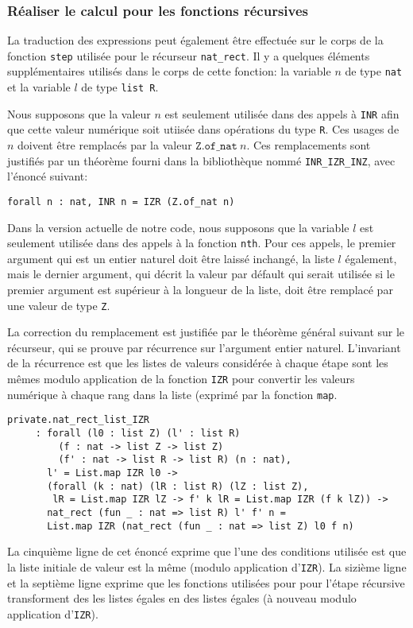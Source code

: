 \documentclass[draft]{jflart}
\begin{document}
\subsubsection{Réaliser le calcul pour les fonctions récursives}
La traduction des expressions peut également être effectuée sur le
corps de la fonction \texttt{step} utilisée pour le récurseur
\texttt{nat\_rect}.  Il y a quelques éléments supplémentaires utilisés
dans le corps de cette fonction: la variable \(n\) de type \texttt{nat}
et la variable \(l\) de type \texttt{list R}.  

Nous supposons que la valeur \(n\) est seulement utilisée dans des
appels à \texttt{INR} afin que cette valeur numérique soit utiisée dans
opérations du type \texttt{R}.  Ces usages de \(n\) doivent être
remplacés par la valeur \(\texttt{Z.of\_nat}~n\).  Ces remplacements sont
justifiés par un théorème fourni dans la bibliothèque nommé
\texttt{INR\_IZR\_INZ}, avec l'énoncé suivant:
\begin{verbatim}
forall n : nat, INR n = IZR (Z.of_nat n)
\end{verbatim}

Dans la version actuelle de notre code, nous supposons que la variable \(l\) est
seulement utilisée dans des appels à la fonction \texttt{nth}.  Pour ces
appels, le premier argument qui est un entier naturel doit être laissé
inchangé, la liste \(l\) également, mais le dernier argument, qui
décrit la valeur par défault qui serait utilisée si le premier
argument est supérieur à la longueur de la liste, doit être remplacé
par une valeur de type \texttt{Z}.

La correction du remplacement est justifiée par le théorème général
suivant sur le récurseur, qui se prouve par récurrence sur l'argument
entier naturel.  L'invariant de la récurrence est que les listes de
valeurs considérée à chaque étape sont les mêmes modulo application de
la fonction \texttt{IZR} pour convertir les valeurs numérique à chaque
rang dans la liste (exprimé par la fonction \texttt{map}.

\begin{verbatim}
private.nat_rect_list_IZR
     : forall (l0 : list Z) (l' : list R) 
         (f : nat -> list Z -> list Z)
         (f' : nat -> list R -> list R) (n : nat),
       l' = List.map IZR l0 ->
       (forall (k : nat) (lR : list R) (lZ : list Z),
        lR = List.map IZR lZ -> f' k lR = List.map IZR (f k lZ)) ->
       nat_rect (fun _ : nat => list R) l' f' n =
       List.map IZR (nat_rect (fun _ : nat => list Z) l0 f n)
\end{verbatim}
La cinquième ligne de cet énoncé exprime que l'une des conditions utilisée
est que la liste initiale de valeur est la même (modulo application
d'\texttt{IZR}).
La sizième ligne et la septième ligne exprime que les fonctions
utilisées pour pour l'étape récursive transforment des les listes
égales en des listes égales (à nouveau modulo application
d'\texttt{IZR}).
\end{document}
